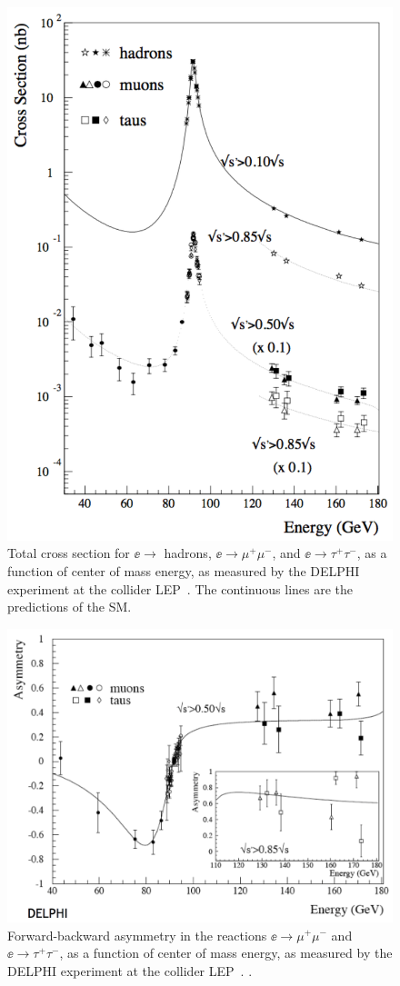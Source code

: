 \documentclass[12pt]{article}
\begin{document}
\begin{figure}
\begin{center}
\includegraphics[width=0.70\hsize]{DELPHItot.pdf}
\end{center}
\caption{Total cross section for $\ee\to$ hadrons, 
$\ee\to \mu^+\mu^-$, and $\ee\to \tau^+\tau^-$,  as a function of
center of mass energy, as measured by the DELPHI
experiment at the collider LEP~\cite{DELPHI}.  The continuous lines
are the predictions of the SM.}
\label{fig:DELPHItot}
\end{figure}



\begin{figure}
\begin{center}
\includegraphics[width=0.80\hsize]{DELPHIasym.pdf}
\end{center}
\caption{Forward-backward asymmetry in the reactions 
$\ee\to \mu^+\mu^-$ and $\ee\to \tau^+\tau^-$,  as a function of
center of mass energy, as measured by the DELPHI
experiment at the collider LEP~\cite{DELPHI}. .}
\label{fig:DELPHI}
\end{figure}
\end{document}
